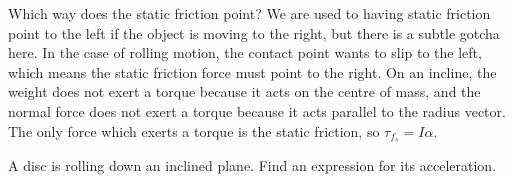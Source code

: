 \documentclass[../classical_mechanics.tex]{subfiles}
\begin{document}
            Which way does the static friction point?
            We are used to having static friction point to the left if the object is moving to the right, but there is a subtle gotcha here.
            In the case of rolling motion, the contact point wants to slip to the left, which means the static friction force must point to the right.
            On an incline, the weight does not exert a torque because it acts on the centre of mass, and the normal force does not exert a torque because it acts parallel to the radius vector.
            The only force which exerts a torque is the static friction, so $\tau_{f_s}=I\alpha$.
            \begin{example}
                A disc is rolling down an inclined plane.
                Find an expression for its acceleration.
                \begin{figure}[H]
                    \centering
                \end{figure}
                

\end{example}
\end{document}
